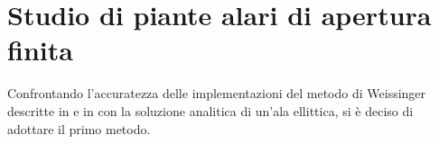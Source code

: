 \documentclass{jfm}
\begin{document}
\section{Studio di piante alari di apertura finita}
Confrontando l'accuratezza delle implementazioni del metodo di Weissinger descritte in \cite{itca} e in \cite{ws} con la soluzione analitica di un'ala ellittica, si è deciso di adottare il primo metodo. 

\end{document}
